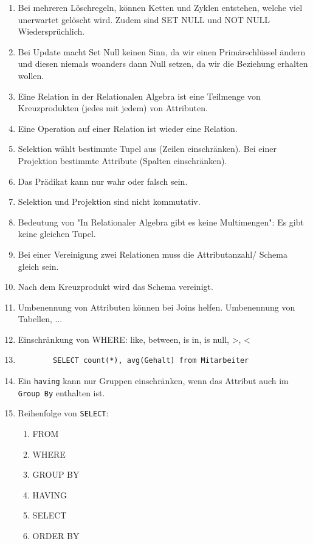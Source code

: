 \documentclass[a4paper]{article}
\begin{document}
\begin{enumerate}
\begin{enumerate}
    \end{enumerate}
    \item Bei mehreren Löschregeln, können Ketten und Zyklen entstehen, welche viel unerwartet gelöscht wird. Zudem sind SET NULL und NOT NULL Wiedersprüchlich.
    \item Bei Update macht Set Null keinen Sinn, da wir einen Primärschlüssel ändern und diesen niemals woanders dann Null setzen, da wir die Beziehung erhalten wollen.
    \item Eine Relation in der Relationalen Algebra ist eine Teilmenge von Kreuzprodukten (jedes mit jedem) von Attributen.
    \item Eine Operation auf einer Relation ist wieder eine Relation.
    \item Selektion wählt bestimmte Tupel aus (Zeilen einschränken). Bei einer Projektion bestimmte Attribute (Spalten einschränken).
    \item Das Prädikat kann nur wahr oder falsch sein.
    \item Selektion und Projektion sind nicht kommutativ.
    \item Bedeutung von "In Relationaler Algebra gibt es keine Multimengen": Es gibt keine gleichen Tupel.
    \item Bei einer Vereinigung zwei Relationen muss die Attributanzahl/ Schema gleich sein.
    \item Nach dem Kreuzprodukt wird das Schema vereinigt.
    \item Umbenennung von Attributen können bei Joins helfen. Umbenennung von Tabellen, ...
    \item Einschränkung von WHERE: like, between, is in, is null, >, <
    \item \begin{lstlisting}
        SELECT count(*), avg(Gehalt) from Mitarbeiter
    \end{lstlisting}
    \item Ein \lstinline|having| kann nur Gruppen einschränken, wenn das Attribut auch im \lstinline|Group By| enthalten ist.
    \item Reihenfolge von \lstinline|SELECT|:
    \begin{enumerate}
        \item FROM
        \item WHERE
        \item GROUP BY
        \item HAVING
        \item SELECT
        \item ORDER BY

\end{enumerate}
\end{enumerate}
\end{document}
